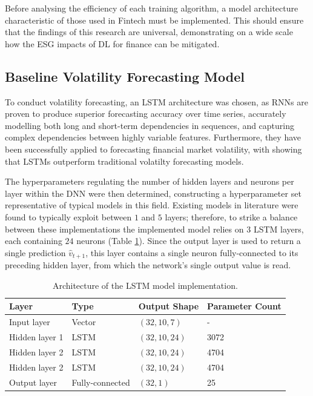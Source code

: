 \documentclass[a4paper, 11pt]{report}
\begin{document}
    Before analysing the efficiency of each training algorithm, a model architecture characteristic of those used in Fintech must be implemented. This should ensure that the findings of this research are universal, demonstrating on a wide scale how the ESG impacts of DL for finance can be mitigated.
    

    \subsection{Baseline Volatility Forecasting Model}
    \label{section: model-architecture}

    To conduct volatility forecasting, an LSTM architecture was chosen, as RNNs are proven to produce superior forecasting accuracy over time series, accurately modelling both long and short-term dependencies in sequences, and capturing complex dependencies between highly variable features. Furthermore, they have been successfully applied to forecasting financial market volatility, with \citet{bucci-2020} showing that LSTMs outperform traditional volatilty forecasting models.

    The hyperparameters regulating the number of hidden layers and neurons per layer within the DNN were then determined, constructing a hyperparameter set representative of typical models in this field. Existing models in literature were found to typically exploit between $1$ \citep{bucci-2020} and $5$ \citep{kim-2018} layers; therefore, to strike a balance between these implementations the implemented model relies on $3$ LSTM layers, each containing $24$ neurons (Table \ref{table: architecture}). Since the output layer is used to return a single prediction $\hat{v}_{t+1}$, this layer contains a single neuron fully-connected to its preceding hidden layer, from which the network's single output value is read.


    \begin{table}[ht]
        \centering
        \begin{tabular}{|l|l|l|l|} 
        \hline
        \textbf{\footnotesize Layer} & \textbf{\footnotesize Type} & \textbf{\footnotesize Output Shape}   & \textbf{\footnotesize Parameter Count}  \\ 
        \hline
        Input layer    & Vector        & $(32, 10, 7)$  & -                         \\ 
        \hline
        Hidden layer 1 & LSTM          & $(32, 10, 24)$ & 3072                      \\ 
        \hline
        Hidden layer 2 & LSTM          & $(32, 10, 24)$ & 4704                      \\ 
        \hline
        Hidden layer 2 & LSTM          & $(32, 10, 24)$ & 4704                      \\ 
        \hline
        Output layer   & Fully-connected           & $(32, 1)$      & 25                        \\
        \hline
        \end{tabular}
        \caption{\centering Architecture of the LSTM model implementation.}
        \label{table: architecture}
    \end{table}
\end{document}
